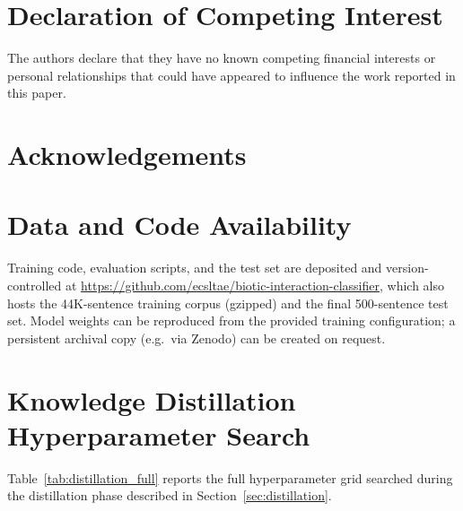 \documentclass[a4paper,fleqn]{cas-sc}
\begin{document}
\printcredits

\section*{Declaration of Competing Interest}

The authors declare that they have no known competing financial interests
or personal relationships that could have appeared to influence the work
reported in this paper.

\section*{Acknowledgements}


\section*{Data and Code Availability}

Training code, evaluation scripts, and the test set are deposited and
version-controlled at
\url{https://github.com/ecsltae/biotic-interaction-classifier}, which
also hosts the 44K-sentence training corpus (gzipped) and the final
500-sentence test set. Model weights can be reproduced from the provided
training configuration; a persistent archival copy (e.g.\ via Zenodo) can
be created on request.




\clearpage
\onecolumn
\appendix

\FloatBarrier
\section{Knowledge Distillation Hyperparameter Search}
\label{app:distillation}

Table~\ref{tab:distillation_full} reports the full hyperparameter grid
searched during the distillation phase described in
Section~\ref{sec:distillation}.
\end{document}
